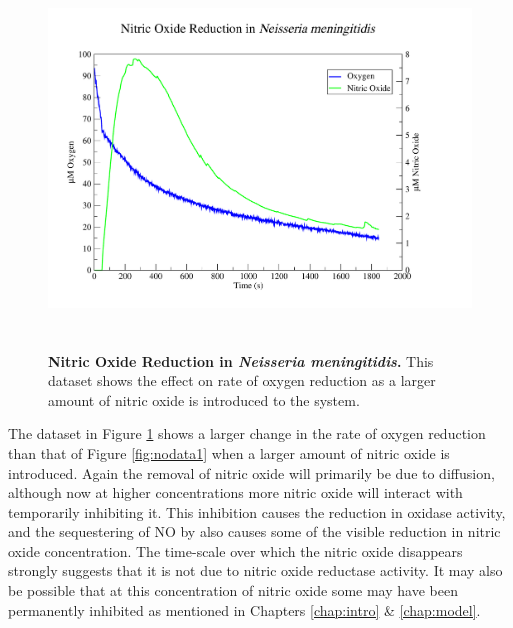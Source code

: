 \begin{figure}[tbp]
 \centering
 \includegraphics[height=10cm, trim=2cm 1cm 4cm 1cm]{./06-noreduction/data/aer-no-data2.pdf}
 \caption[{Nitric Oxide Reduction in \textit{Neisseria meningitidis}.}]{{\bf Nitric Oxide Reduction in \textit{Neisseria meningitidis}.} This dataset shows the effect on rate of oxygen reduction as a larger amount of nitric oxide is introduced to the system.}
 \label{fig:nodata2}
\end{figure}
The dataset in Figure \ref{fig:nodata2} shows a larger change in the rate of oxygen reduction than that of Figure \ref{fig:nodata1} when a larger amount of nitric oxide is introduced. Again the removal of nitric oxide will primarily be due to diffusion, although now at higher concentrations more nitric oxide will interact with \cbbthree{} temporarily inhibiting it. This inhibition causes the reduction in oxidase activity, and the sequestering of NO by \cbbthree{} also causes some of the visible reduction in nitric oxide concentration. The time-scale over which the nitric oxide disappears strongly suggests that it is not due to nitric oxide reductase activity. It may also be possible that at this concentration of nitric oxide some \cbbthree{} may have been permanently inhibited as mentioned in Chapters \ref{chap:intro} \& \ref{chap:model}.

